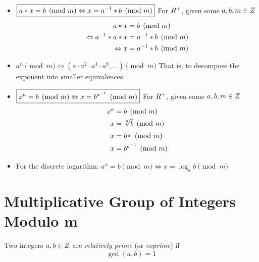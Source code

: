 \begin{itemize}
    \item $\boxed{a \ast x = b \pmod{m} \Leftrightarrow x = {a}^{-1} \ast b \pmod{m}}$
        \subitem For $\relax{R}^{+}$, given some $a, b, m \in \relax{Z}$
        \begin{align}
            a \ast x                                  &= b \pmod{m} \\
            \Leftrightarrow {a}^{-1} \ast a \ast x &= {a}^{-1} \ast b \pmod{m} \\
            \Leftrightarrow x                         &= {a}^{-1} \ast b \pmod{m}
        \end{align}
    \item $\boxed{a^n \pmod{m} \Leftrightarrow (a \cdot a^2 \cdot a^4 \cdot a^8, \dots) \pmod{m}}$
        \subitem That is, to decompose the exponent into smaller equivalences.
    \item $\boxed{x^a = b \pmod{m} \Leftrightarrow x = b^{{a}^{-1}} \pmod{m}}$
        \subitem For $\relax{R}^{+}$, given some $a, b, m \in \relax{Z}$
        \begin{align}
            x^a &= b \pmod{m} \\
            x   &= \sqrt[a]{b} \pmod{m} \\
            x   &= b^{\frac{1}{a}} \pmod{m} \\
            x   &= b^{{a}^{-1}} \pmod{m}
        \end{align}
    \item For the discrete logarithm: $\boxed{a^x = b \pmod{m} \Leftrightarrow x = \log_a{b} \pmod{m}}$
\end{itemize}

\section{Multiplicative Group of Integers Modulo m}

\begin{definition}
    Two integers $a, b \in \relax{Z}$ are \textit{relatively prime} (or \textit{coprime}) if
    \begin{equation}
        \gcd(a, b) = 1
    \end{equation}
\end{definition}

